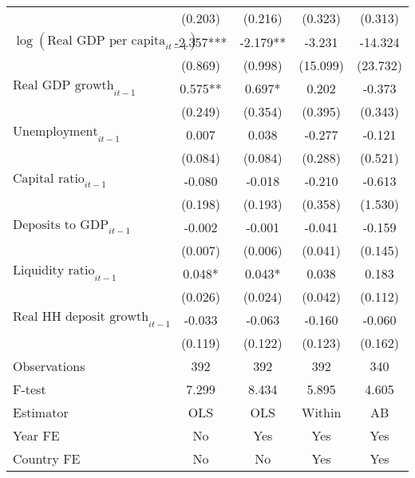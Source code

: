 \begin{longtable}{m{8cm}*{4}{c}}
                    &     (0.203)   &     (0.216)   &     (0.323)   &     (0.313)   \\
$\log(\text{Real GDP per capita}_{it-1})$&      -2.357***&      -2.179** &      -3.231   &     -14.324   \\
                    &     (0.869)   &     (0.998)   &    (15.099)   &    (23.732)   \\
$\text{Real GDP growth}_{it-1}$&       0.575** &       0.697*  &       0.202   &      -0.373   \\
                    &     (0.249)   &     (0.354)   &     (0.395)   &     (0.343)   \\
$\text{Unemployment}_{it-1}$&       0.007   &       0.038   &      -0.277   &      -0.121   \\
                    &     (0.084)   &     (0.084)   &     (0.288)   &     (0.521)   \\
$\text{Capital ratio}_{it-1}$&      -0.080   &      -0.018   &      -0.210   &      -0.613   \\
                    &     (0.198)   &     (0.193)   &     (0.358)   &     (1.530)   \\
$\text{Deposits to GDP}_{it-1}$&      -0.002   &      -0.001   &      -0.041   &      -0.159   \\
                    &     (0.007)   &     (0.006)   &     (0.041)   &     (0.145)   \\
$\text{Liquidity ratio}_{it-1}$&       0.048*  &       0.043*  &       0.038   &       0.183   \\
                    &     (0.026)   &     (0.024)   &     (0.042)   &     (0.112)   \\
$\text{Real HH deposit growth}_{it-1}$&      -0.033   &      -0.063   &      -0.160   &      -0.060   \\
                    &     (0.119)   &     (0.122)   &     (0.123)   &     (0.162)   \\
\midrule
Observations        &         392   &         392   &         392   &         340   \\
F-test              &       7.299   &       8.434   &       5.895   &       4.605   \\
Estimator           &         OLS   &         OLS   &      Within   &          AB   \\
Year FE             &          No   &         Yes   &         Yes   &         Yes   \\
Country FE          &          No   &          No   &         Yes   &         Yes   \\

\end{longtable}
